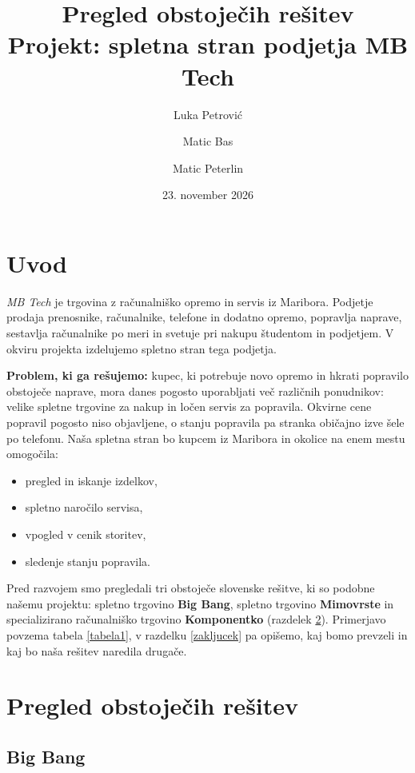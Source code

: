 \documentclass[11pt,a4paper]{article}
\title{Pregled obstoječih rešitev\\[4pt] \large Projekt: spletna stran podjetja MB Tech}
\author{Luka Petrović \and Matic Bas \and Matic Peterlin}
\date{23. november 2026}
\begin{document}
\maketitle

\tableofcontents

\section{Uvod}

\emph{MB Tech} je trgovina z računalniško opremo in servis iz Maribora. Podjetje prodaja
prenosnike, računalnike, telefone in dodatno opremo, popravlja naprave, sestavlja
računalnike po meri in svetuje pri nakupu študentom in podjetjem. V okviru projekta
izdelujemo spletno stran tega podjetja.

\textbf{Problem, ki ga rešujemo:} kupec, ki potrebuje novo opremo in hkrati popravilo
obstoječe naprave, mora danes pogosto uporabljati več različnih ponudnikov: velike
spletne trgovine za nakup in ločen servis za popravila. Okvirne cene popravil pogosto
niso objavljene, o stanju popravila pa stranka običajno izve šele po telefonu. Naša
spletna stran bo kupcem iz Maribora in okolice na enem mestu omogočila:

\begin{itemize}
\item pregled in iskanje izdelkov,
\item spletno naročilo servisa,
\item vpogled v cenik storitev,
\item sledenje stanju popravila.
\end{itemize}

Pred razvojem smo pregledali tri obstoječe slovenske rešitve, ki so podobne našemu
projektu: spletno trgovino \textbf{Big Bang}, spletno trgovino \textbf{Mimovrste} in
specializirano računalniško trgovino \textbf{Komponentko} (razdelek \ref{pregled}).
Primerjavo povzema tabela \ref{tabela1}, v razdelku \ref{zakljucek} pa opišemo, kaj
bomo prevzeli in kaj bo naša rešitev naredila drugače.

\section{Pregled obstoječih rešitev}
\label{pregled}

\subsection{Big Bang}
\end{document}
